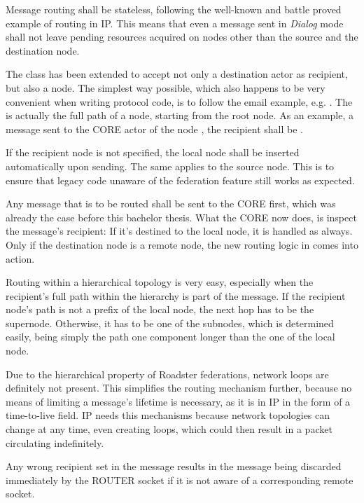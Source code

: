 Message routing shall be stateless, following the well-known and battle proved
example of routing in \gls{IP}. This means that even a message sent in
\emph{Dialog} mode shall not leave pending resources acquired on nodes other
than the source and the destination node.


The  class has been extended to accept
not only a destination actor as recipient, but also a node. The simplest way
possible, which also happens to be very convenient when writing protocol code,
is to follow the email example, e.g. . The  is actually
the full path of a node, starting from the root node. As an example, a message
sent to the CORE actor of the node , the recipient shall be
.

If the recipient node is not specified, the local node shall be inserted
automatically upon sending. The same applies to the source node. This is to
ensure that legacy code unaware of the federation feature still works as expected.

Any message that is to be routed shall be sent to the CORE first, which was
already the case before this bachelor thesis. What the CORE now does, is
inspect the message's recipient: If it's destined to the local node, it is
handled as always. Only if the destination node is a remote node, the new
routing logic in  comes into action.

Routing within a hierarchical topology is very easy, especially when the
recipient's full path within the hierarchy is part of the message. If the
recipient node's path is not a prefix of the local node, the next hop has to be
the supernode. Otherwise, it has to be one of the subnodes, which is determined easily,
being simply the path one component longer than the one of the local node.

Due to the hierarchical property of Roadster federations, network loops are
definitely not present. This simplifies the routing mechanism further, because
no means of limiting a message's lifetime is necessary, as it is in \gls{IP} in
the form of a time-to-live field. IP needs this mechanisms because network
topologies can change at any time, even creating loops, which could then result
in a packet circulating indefinitely.

Any wrong recipient set in the message results in the message being discarded
immediately by the ROUTER socket if it is not aware of a corresponding remote socket.

